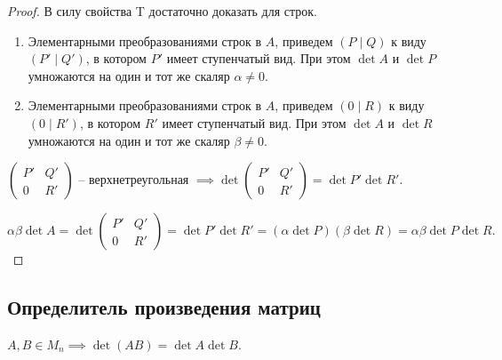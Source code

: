 \begin{proof}
    В силу свойства T достаточно доказать для строк.

    \begin{enumerate}
    \item
        Элементарными преобразованиями строк в $A$, приведем $(P \mid Q)$ к виду $(P' \mid Q')$, в котором $P'$ имеет ступенчатый вид. При этом $\det A$ и $\det P$ умножаются на один и тот же скаляр $\alpha \neq 0$.

    \item
        Элементарными преобразованиями строк в $A$, приведем $(0 \mid R)$ к виду $(0 \mid R')$, в котором $R'$ имеет ступенчатый вид. При этом $\det A$ и $\det R$ умножаются на один и тот же скаляр $\beta \neq 0$.
    \end{enumerate}

    $\begin{pmatrix} P' & Q' \\ 0 & R' \end{pmatrix} $ -- верхнетреугольная $\implies \det \begin{pmatrix} P' & Q' \\ 0 & R' \end{pmatrix} = \det P' \det R'$.

    \begin{equation*}
        \alpha \beta \det A = \det \begin{pmatrix} P' & Q' \\ 0 & R' \end{pmatrix} = \det P' \det R' = (\alpha \det P) (\beta \det R) = \alpha \beta \det P \det R
    .\end{equation*}
\end{proof}


\subsection{Определитель произведения матриц}
\begin{theorem}
    $A, B \in M_n \implies \det(AB) = \det A \det B$.
\end{theorem}

